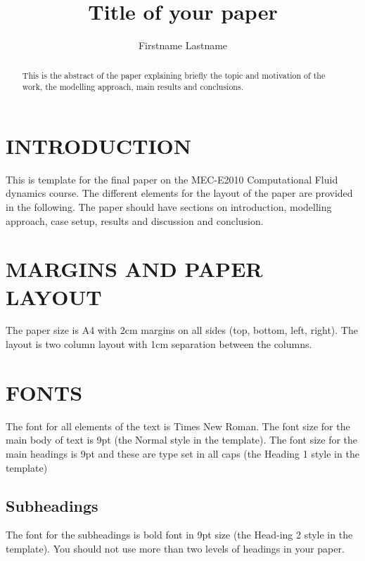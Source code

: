 \documentclass{cfm_paper} %
\begin{document}

\title{Title of your paper}
\author{Firstname Lastname}

\maketitle

\begin{abstract}
This is the abstract of the paper explaining briefly the topic and motivation of the work, the modelling approach, main results and conclusions.
\end{abstract}


\section*{INTRODUCTION} %
This is template for the final paper on the MEC-E2010 Computational Fluid dynamics course. The different elements for the layout of the paper are provided in the following. The paper should have sections on introduction, modelling approach, case setup, results and discussion and conclusion.

\section*{MARGINS AND PAPER LAYOUT}
The paper size is A4 with 2cm margins on all sides (top, bottom, left, right). The layout is two column layout with 1cm separation between the columns. 

\section*{FONTS}
The font for all elements of the text is Times New Roman. The font size for the main body of text is 9pt (the Normal style in the template). The font size for the main headings is 9pt and these are type set in all caps (the Heading 1 style in the template)

\subsection*{Subheadings}
The font for the subheadings is bold font in 9pt size (the Head-ing 2 style in the template). You should not use more than two levels of headings in your paper.
\end{document}
